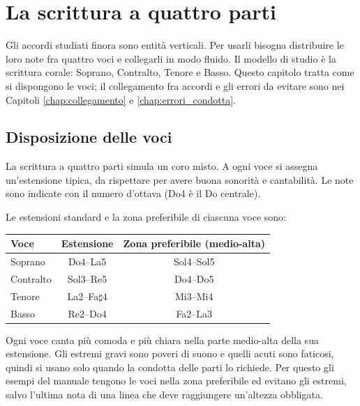 \chapter{La scrittura a quattro parti}
\label{chap:condotta_voci}

Gli accordi studiati finora sono entità verticali. Per usarli bisogna distribuire le loro note fra quattro voci e collegarli in modo fluido. Il modello di studio è la scrittura corale: Soprano, Contralto, Tenore e Basso. Questo capitolo tratta come si dispongono le voci; il collegamento fra accordi e gli errori da evitare sono nei Capitoli \ref{chap:collegamento} e \ref{chap:errori_condotta}.

\section{Disposizione delle voci}
\label{sec:disposizione_voci}

La scrittura a quattro parti simula un coro misto. A ogni voce si assegna un'estensione tipica, da rispettare per avere buona sonorità e cantabilità. Le note sono indicate con il numero d'ottava (Do4 è il Do centrale).

\begin{definizione}
	\label{def:estensione_voci}
	Le estensioni standard e la zona preferibile di ciascuna voce sono:
	\begin{center}
	\begin{tabular}{lcc}
	\toprule
	\textbf{Voce} & \textbf{Estensione} & \textbf{Zona preferibile (medio-alta)} \\
	\midrule
	Soprano  & Do4--La5 & Sol4--Sol5 \\
	Contralto & Sol3--Re5 & Do4--Do5 \\
	Tenore   & La2--Fa$\sharp$4 & Mi3--Mi4 \\
	Basso    & Re2--Do4 & Fa2--La3 \\
	\bottomrule
	\end{tabular}
	\end{center}
\end{definizione}

Ogni voce canta più comoda e più chiara nella parte medio-alta della sua estensione. Gli estremi gravi sono poveri di suono e quelli acuti sono faticosi, quindi si usano solo quando la condotta delle parti lo richiede. Per questo gli esempi del manuale tengono le voci nella zona preferibile ed evitano gli estremi, salvo l'ultima nota di una linea che deve raggiungere un'altezza obbligata.


